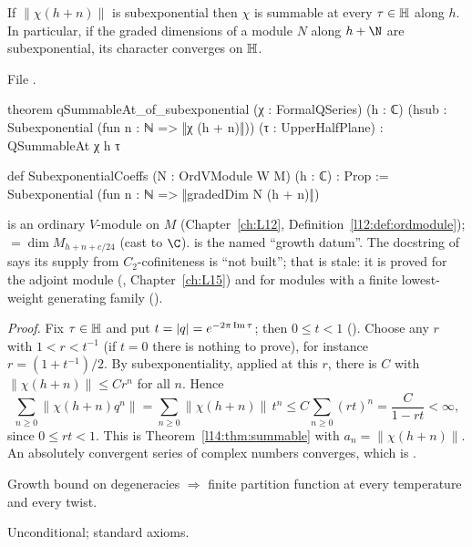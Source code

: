 \begin{theorem}\label{l14:thm:qsummable}
If $\|\chi(h+n)\|$ is subexponential then $\chi$ is summable at every $\tau\in\mathbb{H}$ along $h$. In particular, if the
graded dimensions of a module $N$ along $h+\N$ are subexponential, its character converges on $\mathbb{H}$.
\end{theorem}
\noindent File .
\begin{leancode}
theorem qSummableAt_of_subexponential (χ : FormalQSeries) (h : ℂ)
    (hsub : Subexponential (fun n : ℕ => ‖χ (h + n)‖)) (τ : UpperHalfPlane) :
    QSummableAt χ h τ

def SubexponentialCoeffs (N : OrdVModule W M) (h : ℂ) : Prop :=
  Subexponential (fun n : ℕ => ‖gradedDim N (h + n)‖)
\end{leancode}
\begin{dictionary}
 is an ordinary $V$-module on $M$ (Chapter~\ref{ch:L12}, Definition~\ref{l12:def:ordmodule});
 $=\dim M_{h+n+c/24}$ (cast to $\C$).  is the named ``growth datum''. The
docstring of  says its supply from $C_2$-cofiniteness is ``not built''; that is stale: it
is proved for the adjoint module (, Chapter~\ref{ch:L15}) and for modules
with a finite lowest-weight generating family ().
\end{dictionary}
\noindent\emph{Proof.} Fix $\tau\in\mathbb{H}$ and put $t = |q| = e^{-2\pi\operatorname{Im}\tau}$; then $0\le t<1$
(). Choose any $r$ with $1<r<t^{-1}$ (if $t = 0$ there is nothing to prove), for instance
$r = (1+t^{-1})/2$. By subexponentiality, applied at this $r$, there is $C$ with $\|\chi(h+n)\|\le Cr^n$ for all $n$. Hence
\begin{equation*}
  \sum_{n\ge0}\|\chi(h+n)q^n\| = \sum_{n\ge0}\|\chi(h+n)\|\,t^n \le C\sum_{n\ge0}(rt)^n = \frac{C}{1-rt}<\infty ,
\end{equation*}
since $0\le rt<1$. This is Theorem~\ref{l14:thm:summable} with $a_n = \|\chi(h+n)\|$. An absolutely convergent series of complex
numbers converges, which is .
\begin{physics}
Growth bound on degeneracies $\Rightarrow$ finite partition function at every temperature and every twist.
\end{physics}
\begin{status}
Unconditional; standard axioms.
\end{status}

